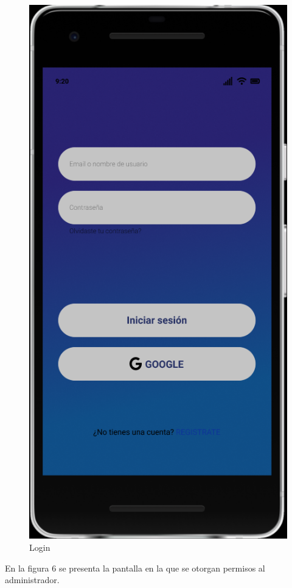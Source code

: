 \documentclass{article}
\begin{document}
\begin{figure}[H]
    \centering
    \includegraphics[scale=0.8]{imgs/Figma/Login}
    \caption{Login}
\end{figure}
En la figura 6 se presenta la pantalla en la que se otorgan permisos al administrador.
\end{document}

